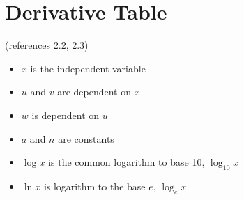\documentclass[
]{book}
\providecommand{\tightlist}{%
  \setlength{\itemsep}{0pt}\setlength{\parskip}{0pt}}
\begin{document}
\hypertarget{derivative-table}{%
\section{Derivative Table}\label{derivative-table}}

(references 2.2, 2.3)

\begin{itemize}
\tightlist
\item
  \(x\) is the independent variable
\item
  \(u\) and \(v\) are dependent on \(x\)
\item
  \(w\) is dependent on \(u\)
\item
  \(a\) and \(n\) are constants
\item
  \(\log{x}\) is the common logarithm to base 10, \(\log_{10}{x}\)
\item
  \(\ln{x}\) is logarithm to the base \(e\), \(\log_e{x}\)
\end{itemize}
\end{document}

